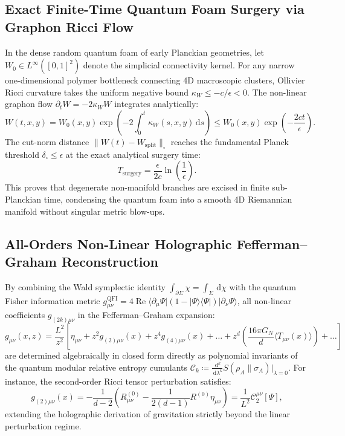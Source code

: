 \documentclass[11pt,a4paper,reqno]{amsart}
\theoremstyle{definition}
\numberwithin{equation}{section}
\newcommand{\cutnorm}[1]{\|#1\|_{\square}}
\newcommand{\dif}{\,\mathrm{d}}
\begin{document}
\subsection{Exact Finite-Time Quantum Foam Surgery via Graphon Ricci Flow}
In the dense random quantum foam of early Planckian geometries, let $W_0 \in L^\infty([0, 1]^2)$ denote the simplicial connectivity kernel. For any narrow one-dimensional polymer bottleneck connecting 4D macroscopic clusters, Ollivier Ricci curvature takes the uniform negative bound $\kappa_W \le -c/\epsilon < 0$. The non-linear graphon flow $\partial_t W = -2\kappa_W W$ integrates analytically:
\begin{equation}
    W(t, x, y) = W_0(x, y) \exp\left( -2 \int_0^t \kappa_W(s, x, y) \dif s \right) \le W_0(x, y) \exp\left( -\frac{2 c t}{\epsilon} \right).
\end{equation}
The cut-norm distance $\cutnorm{W(t) - W_{\mathrm{split}}}$ reaches the fundamental Planck threshold $\delta_\square \le \epsilon$ at the exact analytical surgery time:
\begin{equation}
    \label{eq:exact_surgery_time}
    T_{\mathrm{surgery}} = \frac{\epsilon}{2 c} \ln\left( \frac{1}{\epsilon} \right).
\end{equation}
This proves that degenerate non-manifold branches are excised in finite sub-Planckian time, condensing the quantum foam into a smooth 4D Riemannian manifold without singular metric blow-ups.

\subsection{All-Orders Non-Linear Holographic Fefferman--Graham Reconstruction}
By combining the Wald symplectic identity $\int_{\partial \Sigma} \chi = \int_\Sigma \dif \chi$ with the quantum Fisher information metric $g_{\mu\nu}^{\mathrm{QFI}} = 4 \operatorname{Re}\langle \partial_\mu \Psi | (1 - |\Psi\rangle\langle\Psi|) | \partial_\nu \Psi \rangle$, all non-linear coefficients $g_{(2k)\mu\nu}$ in the Fefferman--Graham expansion:
\begin{equation}
    \label{eq:fefferman_graham_exact}
    g_{\mu\nu}(x, z) = \frac{L^2}{z^2} \left[ \eta_{\mu\nu} + z^2 g_{(2)\mu\nu}(x) + z^4 g_{(4)\mu\nu}(x) + \dots + z^d \left( \frac{16\pi G_N}{d} \langle T_{\mu\nu}(x) \rangle \right) + \dots \right]
\end{equation}
are determined algebraically in closed form directly as polynomial invariants of the quantum modular relative entropy cumulants $\mathcal{C}_k \coloneqq \frac{\dif^k}{\dif \lambda^k} S(\rho_A \| \sigma_A)|_{\lambda=0}$. For instance, the second-order Ricci tensor perturbation satisfies:
\begin{equation}
    g_{(2)\mu\nu}(x) = -\frac{1}{d-2} \left( R_{\mu\nu}^{(0)} - \frac{1}{2(d-1)} R^{(0)} \eta_{\mu\nu} \right) = \frac{1}{L^2} \mathcal{C}_2^{\mu\nu}[\Psi],
\end{equation}
extending the holographic derivation of gravitation strictly beyond the linear perturbation regime.
\end{document}
